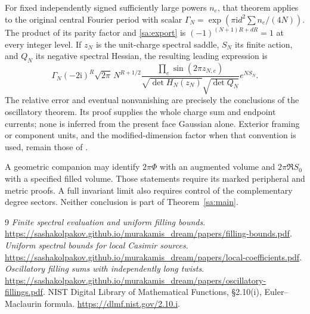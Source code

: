 \documentclass[11pt]{article}
\numberwithin{equation}{section}
\theoremstyle{definition}\newtheorem{definition}[theorem]{Definition}
\theoremstyle{remark}\newtheorem{remark}[theorem]{Remark}
\newcommand{\ii}{\mathrm i}
\begin{document}
For fixed independently signed sufficiently large powers $n_e$, that
theorem applies to the original central Fourier period with scalar
$\Gamma_N=\exp(\pi\ii d^2\sum n_e/(4N))$. The product of its parity
factor and \eqref{sa:export} is
$(-1)^{(N+1)R+dR}=1$ at every integer level. If $z_N$ is the
unit-charge spectral saddle, $S_N$ its finite action, and $Q_N$ its
negative spectral Hessian, the resulting leading expression is
\[
 \Gamma_N(-2\ii)^R\sqrt{2\pi}\,N^{R+1/2}
 \frac{\prod_e\sin(2\pi z_{N,e})}
       {\sqrt{\det H_N(z_N)}\sqrt{\det Q_N}}e^{NS_N}.
\]
The relative error and eventual nonvanishing are precisely the
conclusions of the oscillatory theorem. Its proof supplies the whole
charge sum and endpoint currents; none is inferred from the present
face Gaussian alone. Exterior framing or component units, and the
modified-dimension factor when that convention is used, remain those
of \cite{Finite}.

A geometric companion may identify $2\pi\Phi$ with an augmented volume
and $2\pi\Re S_0$ with a specified filled volume. Those statements
require its marked peripheral and metric proofs. A full invariant
limit also requires control of the complementary degree sectors.
Neither conclusion is part of Theorem~\ref{sa:main}.

\begin{thebibliography}{9}
 \emph{Finite spectral evaluation and uniform filling bounds}.
\url{https://sashakolpakov.github.io/murakamis_dream/papers/filling-bounds.pdf}.
 \emph{Uniform spectral bounds for local Casimir sources}.
\url{https://sashakolpakov.github.io/murakamis_dream/papers/local-coefficients.pdf}.
 \emph{Oscillatory filling sums with independently long twists}.
\url{https://sashakolpakov.github.io/murakamis_dream/papers/oscillatory-fillings.pdf}.
 NIST Digital Library of Mathematical Functions,
\S2.10(i), Euler--Maclaurin formula.
\url{https://dlmf.nist.gov/2.10.i}.
\end{thebibliography}
\end{document}

